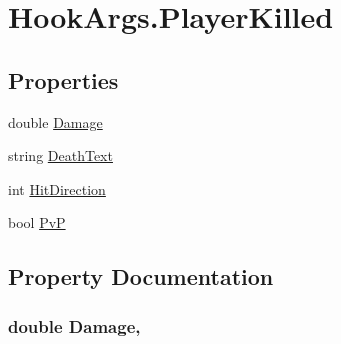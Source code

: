 \hypertarget{structOTA_1_1Plugin_1_1HookArgs_1_1PlayerKilled}{}\section{Hook\+Args.\+Player\+Killed}
\label{structOTA_1_1Plugin_1_1HookArgs_1_1PlayerKilled}
\subsection*{Properties}
\begin{DoxyCompactItemize}
\item 
double \hyperlink{structOTA_1_1Plugin_1_1HookArgs_1_1PlayerKilled_a4f2f7022c0512f89b9560ed283460e35}{Damage}
\item 
string \hyperlink{structOTA_1_1Plugin_1_1HookArgs_1_1PlayerKilled_a6f0a60e64398cf69076e7dd5f338af69}{Death\+Text}
\item 
int \hyperlink{structOTA_1_1Plugin_1_1HookArgs_1_1PlayerKilled_a4278e690a1a75136e8ebce3224d47a60}{Hit\+Direction}
\item 
bool \hyperlink{structOTA_1_1Plugin_1_1HookArgs_1_1PlayerKilled_a1a71271d3ebcb80438bf3637c65755b8}{Pv\+P}
\end{DoxyCompactItemize}


\subsection{Property Documentation}
\hypertarget{structOTA_1_1Plugin_1_1HookArgs_1_1PlayerKilled_a4f2f7022c0512f89b9560ed283460e35}{}
\subsubsection[{Damage}]{\setlength{\rightskip}{0pt plus 5cm}double Damage\hspace{0.3cm}{\ttfamily [get]}, {\ttfamily [set]}}\label{structOTA_1_1Plugin_1_1HookArgs_1_1PlayerKilled_a4f2f7022c0512f89b9560ed283460e35}
\hypertarget{structOTA_1_1Plugin_1_1HookArgs_1_1PlayerKilled_a6f0a60e64398cf69076e7dd5f338af69}{}
